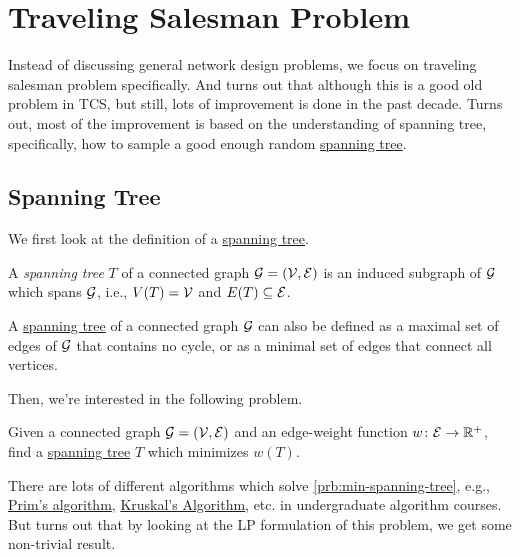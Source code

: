 \chapter{Traveling Salesman Problem}
Instead of discussing general network design problems, we focus on traveling salesman problem specifically. And turns out that although this is a good old problem in TCS, but still, lots of improvement is done in the past decade. Turns out, most of the improvement is based on the understanding of spanning tree, specifically, how to sample a good enough random \hyperref[def:spanning-tree]{spanning tree}.

\section{Spanning Tree}
We first look at the definition of a \hyperref[def:spanning-tree]{spanning tree}.

\begin{definition}\label{def:spanning-tree}
	A \emph{spanning tree} \(T\) of a connected graph \(\mathcal{\MakeUppercase{g}}=(\mathcal{\MakeUppercase{v}} , \mathcal{\MakeUppercase{e}} )\) is an induced subgraph of \(\mathcal{\MakeUppercase{g}} \) which spans \(\mathcal{\MakeUppercase{g}} \), i.e., \(V(T) = \mathcal{\MakeUppercase{v}}\) and \(E(T) \subseteq \mathcal{\MakeUppercase{e}} \).
\end{definition}

\begin{remark}
	A \hyperref[def:spanning-tree]{spanning tree} of a connected graph \(\mathcal{\MakeUppercase{g}} \) can also be defined as a maximal set of edges of \(\mathcal{\MakeUppercase{g}} \) that contains no cycle, or as a minimal set of edges that connect all vertices.
\end{remark}

Then, we're interested in the following problem.

\begin{problem}\label{prb:min-spanning-tree}
Given a connected graph \(\mathcal{\MakeUppercase{g}} =(\mathcal{\MakeUppercase{v}} , \mathcal{\MakeUppercase{e}} )\) and an edge-weight function \(w\colon \mathcal{\MakeUppercase{e}} \to \mathbb{\MakeUppercase{r}} ^+\), find a \hyperref[def:spanning-tree]{spanning tree} \(T\) which minimizes \(w(T)\).
\end{problem}

There are lots of different algorithms which solve \autoref{prb:min-spanning-tree}, e.g., \href{https://en.wikipedia.org/wiki/Prim%27s_algorithm}{Prim's algorithm}, \href{https://en.wikipedia.org/wiki/Kruskal%27s_algorithm}{Kruskal's Algorithm}, etc. in undergraduate algorithm courses. But turns out that by looking at the LP formulation of this problem, we get some non-trivial result. 

